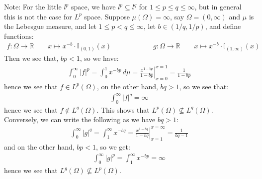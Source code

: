 \documentclass[11pt]{book}
\theoremstyle{break}
\theoremstyle{break}
\newcommand{\R}{\mathbb{R}}
\newcommand{\note}{\color{red}Note: \color{black}}
\begin{document}
\note For the little $l^p$ space, we have $l^p \subseteq l^q$ for $1\leq p\leq q \leq \infty$, but in general this is not the case for $L^p$ space. Suppose $\mu(\Omega) = \infty$, say $\Omega = (0,\infty)$ and $\mu $ is the Lebesgue measure, and let $1\leq p < q \leq \infty$, let $b \in (1/q, 1/p)$, and define functions: 
\begin{align*}
f: \Omega \to \R \qquad x\mapsto x^{-b}\cdot\mathbb{I}_{(0,1)}(x)\qquad\qquad\qquad g:\Omega \to \R\qquad x\mapsto x^{-b}\cdot\mathbb{I}_{(1,\infty)}(x)
\end{align*}
Then we see that, $bp<1$, so we have:
\begin{align*}
\int_0^\infty |f|^p = \int_0^1 x^{-bp}\, d\mu = \left.\frac{x^{1-bp}}{1-bp}\right|_{x=0}^{x=1} = \frac{1}{1-bp}
\end{align*}
hence we see that $f \in L^p(\Omega)$, on the other hand, $bq>1$, so we see that:
\begin{align*}
\int_0^\infty |f|^q = \infty
\end{align*}
hence we see that $f \notin L^q(\Omega)$. This shows that $L^p(\Omega) \nsubseteq L^q(\Omega)$. \\
Conversely, we can write the following as we have $bq>1$:
\begin{align*}
\int_0^\infty |g|^q = \int_1^\infty x^{-bq} = \left.\frac{x^{1-bq}}{1-bq}\right|_{x=1}^{x= \infty} = \frac{1}{bq-1}
\end{align*}
and on the other hand, $bp<1$, so we get:
\begin{align*}
\int_0^\infty |g|^p = \int_1^\infty x^{-bp} = \infty
\end{align*}
hence we see that $L^{g}(\Omega) \nsubseteq L^p(\Omega)$. 
\newpage
\end{document}
